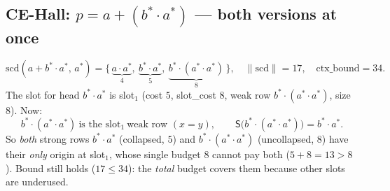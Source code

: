 \documentclass{article}
\newcommand{\rss}[1]{\lVert #1\rVert}                %
\newcommand{\sd}{\mathrm{scd}}                       %
\newcommand{\ctxb}{\mathrm{ctx\_bound}}
\newcommand{\Strong}{\mathsf{S}}                     %
\newcommand{\seq}{\cdot}
\newcommand{\alt}{+}
\begin{document}
\subsection*{CE-Hall: $p=a\alt(b^{*}\seq a^{*})$ --- both versions at once}
\[
\sd(a\alt b^{*}\seq a^{*},\,a^{*})=\{\,\underbrace{a\seq a^{*}}_{4},\ \underbrace{b^{*}\seq a^{*}}_{5},\ \underbrace{b^{*}\seq(a^{*}\seq a^{*})}_{8}\,\},\quad \rss{\sd}=17,\quad \ctxb=34 .
\]
The slot for head $b^{*}\seq a^{*}$ is slot$_1$ (cost $5$, slot\_cost $8$, weak row $b^{*}\seq(a^{*}\seq a^{*})$, size $8$). Now:
\[
b^{*}\seq(a^{*}\seq a^{*})\ \text{is the slot}_1\ \text{weak row }(x{=}y),\qquad
\Strong\bigl(b^{*}\seq(a^{*}\seq a^{*})\bigr)=b^{*}\seq a^{*}.
\]
So \emph{both} strong rows $b^{*}\seq a^{*}$ (collapsed, $5$) and $b^{*}\seq(a^{*}\seq a^{*})$ (uncollapsed, $8$)
have their \emph{only} origin at slot$_1$, whose single budget $8$ cannot pay both ($5+8=13>8$). Bound still
holds ($17\le34$): the \emph{total} budget covers them because other slots are underused.
\end{document}
